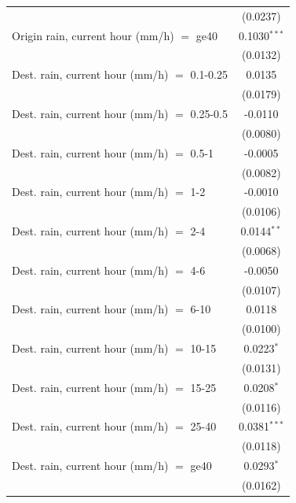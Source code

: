 \begin{tabular}{lc}
                                                 & (0.0237)\\   
   Origin rain, current hour (mm/h) $=$ ge40     & 0.1030$^{***}$\\   
                                                 & (0.0132)\\   
   Dest. rain, current hour (mm/h) $=$ 0.1-0.25  & 0.0135\\   
                                                 & (0.0179)\\   
   Dest. rain, current hour (mm/h) $=$ 0.25-0.5  & -0.0110\\   
                                                 & (0.0080)\\   
   Dest. rain, current hour (mm/h) $=$ 0.5-1     & -0.0005\\   
                                                 & (0.0082)\\   
   Dest. rain, current hour (mm/h) $=$ 1-2       & -0.0010\\   
                                                 & (0.0106)\\   
   Dest. rain, current hour (mm/h) $=$ 2-4       & 0.0144$^{**}$\\   
                                                 & (0.0068)\\   
   Dest. rain, current hour (mm/h) $=$ 4-6       & -0.0050\\   
                                                 & (0.0107)\\   
   Dest. rain, current hour (mm/h) $=$ 6-10      & 0.0118\\   
                                                 & (0.0100)\\   
   Dest. rain, current hour (mm/h) $=$ 10-15     & 0.0223$^{*}$\\   
                                                 & (0.0131)\\   
   Dest. rain, current hour (mm/h) $=$ 15-25     & 0.0208$^{*}$\\   
                                                 & (0.0116)\\   
   Dest. rain, current hour (mm/h) $=$ 25-40     & 0.0381$^{***}$\\   
                                                 & (0.0118)\\   
   Dest. rain, current hour (mm/h) $=$ ge40      & 0.0293$^{*}$\\   
                                                 & (0.0162)\\   

\end{tabular}
